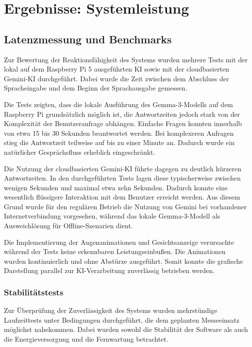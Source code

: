 \section{Ergebnisse: Systemleistung}
\subsection*{Latenzmessung und Benchmarks}
Zur Bewertung der Reaktionsfähigkeit des Systems wurden mehrere Tests mit der lokal auf dem Raspberry Pi 5 ausgeführten KI sowie mit der cloudbasierten Gemini-KI durchgeführt. Dabei wurde die Zeit zwischen dem Abschluss der Spracheingabe und dem Beginn der Sprachausgabe gemessen.

Die Tests zeigten, dass die lokale Ausführung des Gemma-3-Modells auf dem Raspberry Pi grundsätzlich möglich ist, die Antwortzeiten jedoch stark von der Komplexität der Benutzeranfrage abhängen. Einfache Fragen konnten innerhalb von etwa 15 bis 30 Sekunden beantwortet werden. Bei komplexeren Anfragen stieg die Antwortzeit teilweise auf bis zu einer Minute an. Dadurch wurde ein natürlicher Gesprächsfluss erheblich eingeschränkt.

Die Nutzung der cloudbasierten Gemini-KI führte dagegen zu deutlich kürzeren Antwortzeiten. In den durchgeführten Tests lagen diese typischerweise zwischen wenigen Sekunden und maximal etwa zehn Sekunden. Dadurch konnte eine wesentlich flüssigere Interaktion mit dem Benutzer erreicht werden. Aus diesem Grund wurde für den regulären Betrieb die Nutzung von Gemini bei vorhandener Internetverbindung vorgesehen, während das lokale Gemma-3-Modell als Ausweichlösung für Offline-Szenarien dient.

Die Implementierung der Augenanimationen und Gesichtsanzeige verursachte während der Tests keine erkennbaren Leistungseinbußen. Die Animationen wurden kontinuierlich und ohne Abstürze ausgeführt. Somit konnte die grafische Darstellung parallel zur KI-Verarbeitung zuverlässig betrieben werden.


\subsubsection*{Stabilitätstests}

Zur Überprüfung der Zuverlässigkeit des Systems wurden mehrstündige Laufzeittests unter Bedingungen durchgeführt, die dem geplanten Messeeinsatz möglichst nahekommen. Dabei wurden sowohl die Stabilität der Software als auch die Energieversorgung und die Fernwartung betrachtet.

